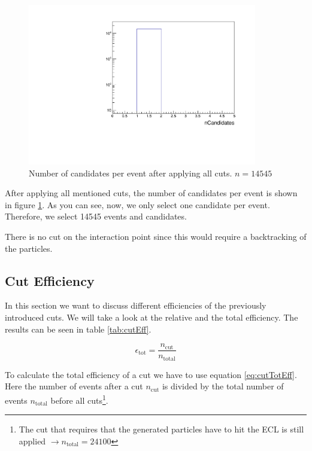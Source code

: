 \documentclass[a4paper,11pt,twosided,final,german,openbib,pdftex,listof=totoc,bibliography=totoc]{scrbook}
\begin{document}
\begin{figure}[h!]
	\centering
	\includegraphics[width=10cm]{Cuts/nCand.pdf}
	\caption[Number Of Candidates Per Event (All Cuts)]{Number of candidates per event after applying all cuts. $n = 14545$}	
	\label{fig:nCand}
\end{figure}

After applying all mentioned cuts, the number of candidates per event is shown in figure \ref{fig:nCand}. As you can see, now, we only select one candidate per event. Therefore, we select 14545 events and candidates.

There is no cut on the interaction point since this would require a backtracking of the particles.




\subsection{Cut Efficiency}

In this section we want to discuss different efficiencies of the previously introduced cuts. We will take a look at the relative and the total efficiency. The results can be seen in table \ref{tab:cutEff}.

\begin{equation}
	\epsilon_{\textrm{tot}} = \frac{n_{\textrm{cut}}}{n_{\textrm{total}}}
	\label{eq:cutTotEff}
\end{equation}

To calculate the total efficiency of a cut we have to use equation \ref{eq:cutTotEff}. Here the number of events after a cut $n_{\textrm{cut}}$ is divided by the total number of events $n_{\textrm{total}}$ before all cuts\footnote{The cut that requires that the generated particles have to hit the ECL is still applied $\rightarrow n_{\textrm{total}} = 24100$}.
\end{document}
